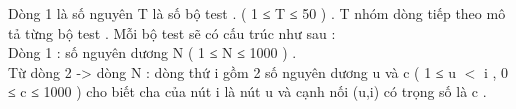 Dòng 1 là số nguyên T là số bộ test . (  1 ≤ T ≤ 50 ) . T nhóm dòng tiếp theo mô tả từng bộ test . Mỗi bộ test sẽ có cấu trúc như sau :   
\\   Dòng 1 : số nguyên dương N ( 1 ≤ N ≤ 1000 ) .   
\\   Từ dòng 2 -> dòng N : dòng thứ i gồm 2 số nguyên dương u và c ( 1 ≤ u $<$ i , 0 ≤ c ≤ 1000 ) cho biết cha của nút i là nút u và cạnh nối (u,i) có trọng số là c .